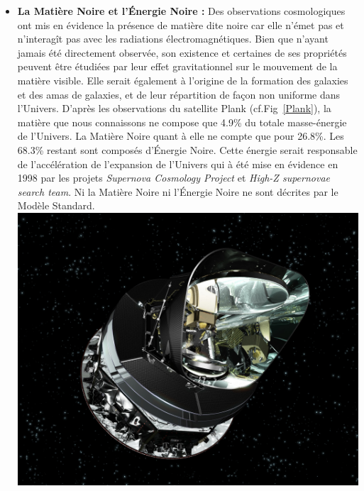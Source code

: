 \begin{itemize}[label=$\bullet$]
\item \textbf{La Matière Noire et l'Énergie Noire :} Des observations cosmologiques ont mis en évidence la présence de matière dite noire car elle n'émet pas et n'interagît pas avec les radiations électromagnétiques. Bien que n'ayant jamais été directement observée, son existence et certaines de ses propriétés peuvent être étudiées par leur effet gravitationnel sur le mouvement de la matière visible. Elle serait  également à l'origine de la formation des galaxies et des amas de galaxies, et de leur répartition de façon non uniforme dans l'Univers. D'après les observations du satellite Plank (cf.Fig~\ref{Plank}), la matière que nous connaissons ne compose que \num{4.9}\% du totale masse-énergie de l'Univers. La Matière Noire quant à elle ne compte que pour \num{26.8}\%. Les \num{68.3}\% restant sont composés d'Énergie Noire. Cette énergie serait responsable de l'accélération de l'expansion de l'Univers qui à été mise en évidence en \num{1998} par les projets \textit{Supernova Cosmology Project} et \textit{High-Z supernovae search team}. Ni la Matière Noire ni l'Énergie Noire ne sont décrites par le Modèle Standard.
\marginpar
{
\centering
\includegraphics[width=\marginparwidth]{SM/plank.jpg}
\label{Plank}
} 


\end{itemize}
